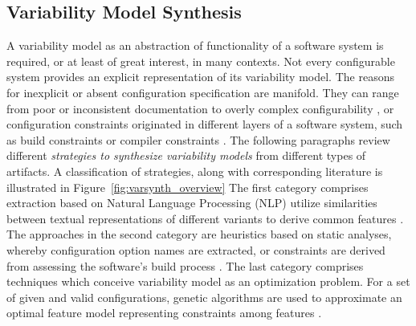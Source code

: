 \subsection{Variability Model Synthesis} \label{sec:feature_model_synthesis} 
A variability model as an abstraction of functionality of a software system is
required, or at least of great interest, in many contexts. Not every
configurable system provides an explicit representation of its variability
model. The reasons for inexplicit or absent configuration specification are
manifold. They can range from poor or inconsistent documentation
\citep{rabkin_static_2011} to overly complex configurability
\citep{xu_hey_2015}, or configuration constraints originated in different layers of a software system,
such as build constraints or compiler constraints
\citep{nadi_mining_2014,nadi_where_2015}.
The following paragraphs review different \emph{strategies to synthesize
variability models} from different types of artifacts. A classification of
strategies, along with corresponding literature is illustrated in Figure~\ref{fig:varsynth_overview}
The first category comprises extraction based on Natural Language Processing (NLP) utilize
similarities between textual representations of different variants to derive
common features \citep{alves_exploratory_2008,bakar_feature_2015}. The
approaches in the second category are heuristics based on static analyses, whereby configuration option names \citep{rabkin_static_2011} are
extracted, or constraints are derived from assessing the software’s build
process \citep{nadi_mining_2014,nadi_where_2015}. The last category comprises
techniques which conceive variability model as an optimization problem. For a set of given and
valid configurations, genetic algorithms are used to approximate an optimal
feature model representing constraints among features 
\citep{lopez-herrejon_reverse_2012,lopez-herrejon_assessment_2015,linsbauer_feature_2014}.

